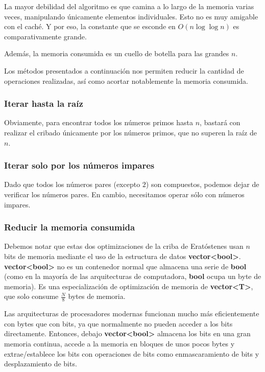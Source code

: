 La mayor debilidad del algoritmo es que camina a lo largo de la memoria varias veces, manipulando únicamente elementos individuales. Esto no es muy amigable con el caché. Y por eso, la constante que se esconde en $O(n \log \log n)$ es comparativamente grande.

Además, la memoria consumida es un cuello de botella para las grandes $n$.

Los métodos presentados a continuación nos permiten reducir la cantidad de operaciones realizadas, así como acortar notablemente la memoria consumida.

\subsubsection{Iterar hasta la raíz}

Obviamente, para encontrar todos los números primos hasta $n$, bastará con realizar el cribado únicamente por los números primos, que no superen la raíz de $n$.

\subsubsection{Iterar solo por los números impares}

Dado que todos los números pares (excepto $2$) son compuestos, podemos dejar de verificar los números pares. En cambio, necesitamos operar sólo con números impares.

\subsubsection{Reducir la memoria consumida}

Debemos notar que estas dos optimizaciones de la criba de Eratóstenes usan $n$ bits de memoria mediante el uso de la estructura de datos \textbf{vector<bool>}.  \textbf{vector<bool>} no es un contenedor normal que almacena una serie de \textbf{bool} (como en la mayoría de las arquitecturas de computadora, \textbf{bool} ocupa un byte de memoria). Es una especialización de optimización de memoria de \textbf{vector<T>}, que solo consume $\frac{N}{8}$ bytes de memoria.

Las arquitecturas de procesadores modernas funcionan mucho más eficientemente con bytes que con bits, ya que normalmente no pueden acceder a los bits directamente. Entonces, debajo \textbf{vector<bool>} almacena los bits en una gran memoria continua, accede a la memoria en bloques de unos pocos bytes y extrae/establece los bits con operaciones de bits como enmascaramiento de bits y desplazamiento de bits.

